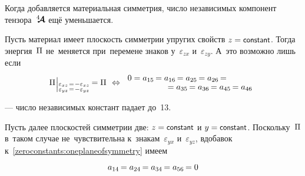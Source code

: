 \begin{otherlanguage}{russian}
Когда добавляется материальная симметрия, число независимых компонент тензора~$\hspace{.08ex}{^4\hspace{-0.72ex}\bm{\mathcal{A}}}\hspace{.08ex}$ ещё уменьшается.

Пусть материал имеет плоскость симметрии упругих свойств ${z = \constant}$.
Тогда энергия~$\Pi$ не~меняется при~перемене знаков у~$\varepsilon_{zx}$ и~$\varepsilon_{zy}$.
А~это возможно лишь если
\begin{equation}\label{zeroconstants:oneplaneofsymmetry}
\potential \hspace{.1ex} \raisemath{-0.2em}{\Bigr\vert}_{\substack{%
\varepsilon_{xz} \hspace{.2ex}=\hspace{.2ex} -\varepsilon_{xz} \\
\varepsilon_{yz} \hspace{.2ex}=\hspace{.2ex} -\varepsilon_{yz}
}} \hspace{-0.2ex} = \potential
\:\,\Leftrightarrow \hspace{-3em}
\begin{array}{c}
0 =
a_{15} \hspace{-0.2ex} = a_{16} \hspace{-0.2ex} = a_{25} \hspace{-0.2ex} = a_{26} \hspace{-0.2ex} =
\\[-0.1em]
\hspace{8em} = a_{35} \hspace{-0.2ex} = a_{36} \hspace{-0.2ex} = a_{45} \hspace{-0.2ex} = a_{46}
\end{array}
\vspace{.1em}\end{equation}

\noindent
--- число независимых констант падает до~13.

Пусть далее плоскостей симметрии две: ${z = \constant}$ и ${y = \constant}$.
Поскольку~$\Pi$ в~таком случае не~чувствительна к~знакам~$\varepsilon_{yx}$ и~$\varepsilon_{yz}$, вдобавок к~\eqref{zeroconstants:oneplaneofsymmetry} имеем

\nopagebreak\vspace{-0.22em}\begin{equation}\label{zeroconstants:2orthotropic}
a_{14} \hspace{-0.2ex} = a_{24} \hspace{-0.2ex} = a_{34} \hspace{-0.2ex} = a_{56} \hspace{-0.2ex} = 0
\end{equation}


\end{otherlanguage}
